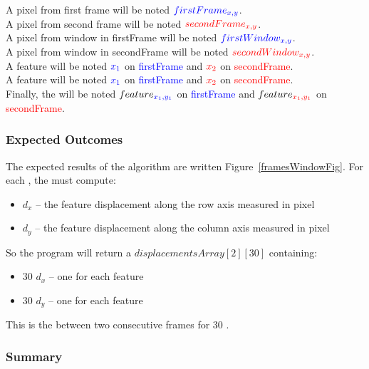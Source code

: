 A pixel from first frame will be noted $\textcolor{blue}{firstFrame_{x,y}}$.\\
A pixel from second frame will be noted $\textcolor{red}{secondFrame_{x,y}}$.\\
A pixel from window in firstFrame will be noted $\textcolor{blue}{firstWindow_{x,y}}$.\\
A pixel from window in secondFrame will be noted $\textcolor{red}{secondWindow_{x,y}}$.\\
A feature  will be noted $\textcolor{blue}{x_{1}}$ on \textcolor{blue}{firstFrame} and $\textcolor{red}{x_{2}}$ on \textcolor{red}{secondFrame}.\\
A feature  will be noted $\textcolor{blue}{x_{1}}$ on \textcolor{blue}{firstFrame} and $\textcolor{red}{x_{2}}$ on \textcolor{red}{secondFrame}.\\
Finally, the  will be noted $feature_{\textcolor{blue}{x_{1},y_{1}}}$ on \textcolor{blue}{firstFrame} and $feature_{\textcolor{red}{x_{1},y_{1}}}$ on \textcolor{red}{secondFrame}.

\subsubsection{Expected Outcomes}

The expected results of the  algorithm are written Figure~\ref{framesWindowFig}. For each , the \vc{} must compute:
\begin{itemize}
	\item \textbf{$d_{x}$} -- the feature displacement along the row axis measured in pixel
	\item \textbf{$d_{y}$} -- the feature displacement along the column axis measured in pixel
\end{itemize}

So the  program will return a  $displacementsArray[2][30]$ containing:
\begin{itemize}
	\item 30 $d_{x}$  -- one for each feature
	\item 30 $d_{y}$  -- one for each feature
\end{itemize}

This is the  between two consecutive frames for 30 .


\subsubsection{Summary}

